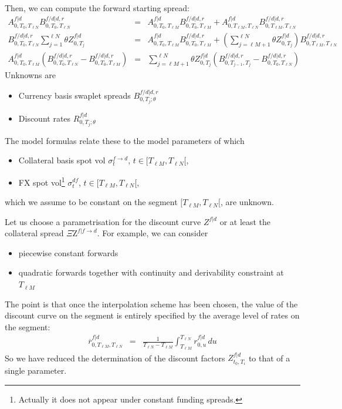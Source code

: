 \documentclass[11pt,english]{amsart}
\newcommand{\f}{\ell}
\newcommand{\QZ}{{\Xi\mathrm{Z}}}
\theoremstyle{definition}
\begin{document}
Then, we can compute the forward starting spread:
\begin{eqnarray}
  A^{f|d}_{0,T_0,T_{\f N}} B^{f/d|d,r}_{0,T_0,T_{\f N}}
  &=& A^{f|d}_{0,T_0,T_{\f M}} B^{f/d|d,r}_{0,T_0,T_{\f M}}  + A^{f|d}_{0,T_{\f M},T_{\f N}} B^{f/d|d,r}_{0,T_{\f M},T_{\f N}} \\
  B^{f/d|d,r}_{0,T_0,T_{\f N}}  \sum_{j=1}^{\f N} \theta Z^{f|d}_{0,T_{j}}
  &=& A^{f|d}_{0,T_0,T_{\f M}} B^{f/d|d,r}_{0,T_0,T_{\f M}}  + \left( \sum_{j=\f M+1}^{\f N} \theta Z^{f|d}_{0,T_{j}} \right) B^{f/d|d,r}_{0,T_{\f M},T_{\f N}} \\
  A^{f|d}_{0,T_0,T_{\f M}} \left(B^{f/d|d,r}_{0,T_0,T_{\f N}} - B^{f/d|d,r}_{0,T_0,T_{\f M}} \right)
  &=&  \sum_{j=\f M+1}^{\f N} \theta Z^{f|d}_{0,T_{j}}  \left( B^{f/d|d,r}_{0,T_{j-1},T_{j}} -B^{f/d|d,r}_{0,T_0,T_{\f N}} \right)
\end{eqnarray}
Unknowns are
\begin{itemize}
\item Currency basis swaplet spreads $B^{f/d|d,r}_{0,T_j;\theta}$
\item Discount rates $R^{f|d}_{0,T_{j};\theta}$
\end{itemize}

The model formulas relate these to the model parameters of which
\begin{itemize}
\item Collateral basis spot vol $\sigma^{f\to d}_{t}$, $t\in [T_{\f M},T_{\f N}[$,
\item FX spot vol\footnote{Actually it does not appear under constant funding spreads.} $\sigma^{df}_{t}$, $t\in [T_{\f M},T_{\f N}[$,
\end{itemize}
which we assume to be constant on the segment $[T_{\f M},T_{\f N}[$, are unknown.

Let us choose a parametrisation for the discount curve $Z^{f|d}$ or at least the collateral spread $\QZ^{f|f\to d}$. For example, we can consider
\begin{itemize}
\item piecewise constant forwards
\item quadratic forwards together with continuity and derivability constraint at $T_{\f M}$
\end{itemize}
The point is that once the interpolation scheme has been chosen, the value of the discount curve on the segment is entirely specified by the average level of rates on the segment:
\begin{eqnarray}
  \overline{r}^{f|d}_{0,T_{\f M},T_{\f N}} &=& \frac{1}{T_{\f N}-T_{\f M}} \int_{T_{\f M}}^{T_{\f N}} r^{f|d}_{0,u} \, du
\end{eqnarray}
So we have reduced the determination of the discount factors $Z^{f|d}_{t_0,T_i}$ to that of a single parameter.
\end{document}
